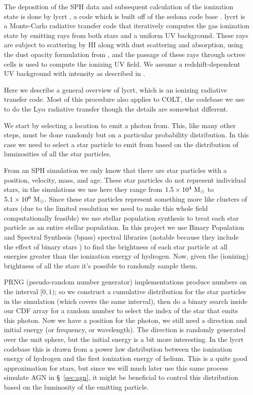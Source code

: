 The deposition of the SPH data and subsequent calculation of the ionization state is done by {\sc lycrt} \citep{Ma2015}, a code which is built off of the {\sc sedona} code base \citep{Kasen2006}.
{\sc lycrt} is a Monte-Carlo radiative transfer code that iteratively computes the gas ionization state by emitting rays from both stars and a uniform UV background.
These rays are subject to scattering by HI along with dust scattering and absorption, using the dust opacity formulation from \citet{Li2001}, and the passage of these rays through octree cells is used to compute the ionizing UV field.
We assume a redshift-dependent UV background with intensity as described in \citet{Faucher-Giguere2009}.

Here we describe a general overview of {\sc lycrt}, which is an ionizing radiative transfer code.
Most of this procedure also applies to {\sc COLT}, the codebase we use to do the Ly$\alpha$ radiative transfer though the details are somewhat different.

We start by selecting a location to emit a photon from.
This, like many other steps, must be done randomly but on a particular probability distribution.
In this case we need to select a star particle to emit from based on the distribution of luminosities of all the star particles.

From an SPH simulation we only know that there are star particles with a position, velocity, mass, and age.
These star particles do not represent individual stars, in the simulations we use here they range from $1.5\times10^{4}\ \rm{M}_{\odot}$ to $5.1\times10^{6}\ \rm{M}_{\odot}$.
Since these star particles represent something more like clusters of stars (due to the limited resolution we need to make this whole field computationally feasible) we use stellar population synthesis to treat each star particle as an entire stellar population.
In this project we use Binary Population and Spectral Synthesis ({\sc bpass}) spectral libraries (notable because they include the effect of binary stars \citep{Eldridge2008}) to find the brightness of each star particle at all energies greater than the ionization energy of hydrogen.
Now, given the (ionizing) brightness of all the stars it's possible to randomly sample them.

PRNG (pseudo-random number generator) implementations produce numbers on the interval $[0, 1)$; so we construct a cumulative distribution for the star particles in the simulation (which covers the same interval), then do a binary search inside our CDF array for a random number to select the index of the star that emits this photon.
Now we have a position for the photon, we still need a direction and initial energy (or frequency, or wavelength).
The direction is randomly generated over the unit sphere, but the initial energy is a bit more interesting.
In the {\sc lycrt} codebase this is drawn from a power law distribution between the ionization energy of hydrogen and the first ionization energy of helium.
This is a quite good approximation for stars, but since we will much later use this same process simulate AGN in \S~\ref{sec:agn}, it might be beneficial to control this distribution based on the luminosity of the emitting particle.

